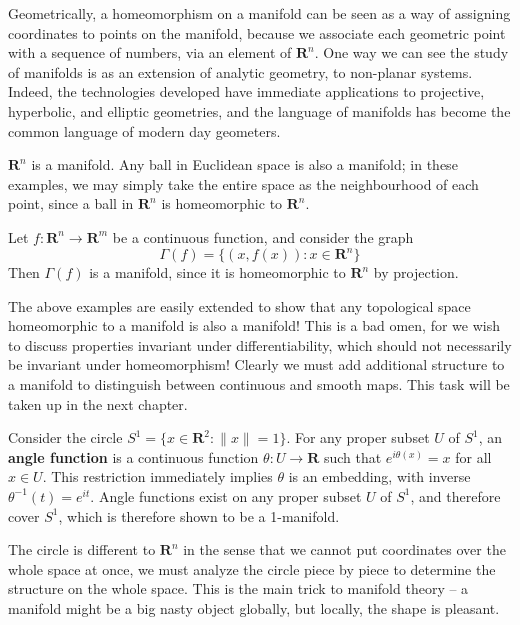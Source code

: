 Geometrically, a homeomorphism on a manifold can be seen as a way of assigning coordinates to points on the manifold, because we associate each geometric point with a sequence of numbers, via an element of $\mathbf{R}^n$. One way we can see the study of manifolds is as an extension of analytic geometry, to non-planar systems. Indeed, the technologies developed have immediate applications to projective, hyperbolic, and elliptic geometries, and the language of manifolds has become the common language of modern day geometers.

\begin{example}
    $\mathbf{R}^n$ is a manifold. Any ball in Euclidean space is also a manifold; in these examples, we may simply take the entire space as the neighbourhood of each point, since a ball in $\mathbf{R}^n$ is homeomorphic to $\mathbf{R}^n$.
\end{example}

\begin{example}
    Let $f: \mathbf{R}^n \to \mathbf{R}^m$ be a continuous function, and consider the graph
    \[ \Gamma(f) = \{ (x, f(x)) : x \in \mathbf{R}^n \} \]
    Then $\Gamma(f)$ is a manifold, since it is homeomorphic to $\mathbf{R}^n$ by projection.
\end{example}

The above examples are easily extended to show that any topological space homeomorphic to a manifold is also a manifold! This is a bad omen, for we wish to discuss properties invariant under differentiability, which should not necessarily be invariant under homeomorphism! Clearly we must add additional structure to a manifold to distinguish between continuous and smooth maps. This task will be taken up in the next chapter.

\begin{example}
    Consider the circle $S^1 = \{ x \in \mathbf{R}^2 : \|x\| = 1 \}$. For any proper subset $U$ of $S^1$, an {\bf angle function} is a continuous function $\theta:U \to \mathbf{R}$ such that $e^{i\theta(x)} = x$ for all $x \in U$. This restriction immediately implies $\theta$ is an embedding, with inverse $\theta^{-1}(t) = e^{it}$. Angle functions exist on any proper subset $U$ of $S^1$, and therefore cover $S^1$, which is therefore shown to be a 1-manifold.
\end{example}

The circle is different to $\mathbf{R}^n$ in the sense that we cannot put coordinates over the whole space at once, we must analyze the circle piece by piece to determine the structure on the whole space. This is the main trick to manifold theory -- a manifold might be a big nasty object globally, but locally, the shape is pleasant.

